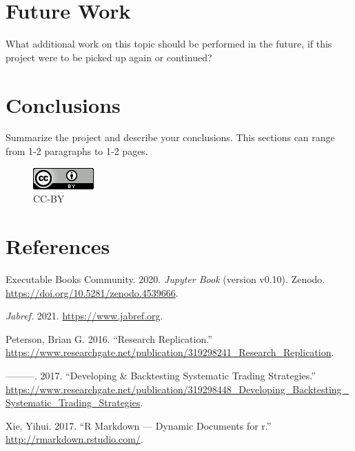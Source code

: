 \documentclass{article}
\newlength{\cslhangindent}
\newlength{\cslentryspacingunit} %
\newenvironment{CSLReferences}[2] %
 {%
  \setlength{\parindent}{0pt}
  \ifodd #1
  \let\oldpar\par
  \def\par{\hangindent=\cslhangindent\oldpar}
  \fi
  \setlength{\parskip}{#2\cslentryspacingunit}
 }%
 {}
\begin{document}
\hypertarget{future-work}{%
\section{Future Work}\label{future-work}}

What additional work on this topic should be performed in the future, if
this project were to be picked up again or continued?

\hypertarget{conclusions}{%
\section{Conclusions}\label{conclusions}}

Summarize the project and describe your conclusions. This sections can
range from 1-2 paragraphs to 1-2 pages.

\newpage

\begin{figure}
\centering
\includegraphics{cc_by_88x31.png}
\caption{CC-BY}
\end{figure}

\hypertarget{references}{%
\section*{References}\label{references}}

\hypertarget{refs}{}
\begin{CSLReferences}{1}{0}
\leavevmode{}%
Executable Books Community. 2020. \emph{Jupyter Book} (version v0.10).
Zenodo. \url{https://doi.org/10.5281/zenodo.4539666}.

\leavevmode{}%
\emph{Jabref.} 2021. \url{https://www.jabref.org}.

\leavevmode{}%
Peterson, Brian G. 2016. {``Research Replication.''}
\url{https://www.researchgate.net/publication/319298241_Research_Replication}.

\leavevmode{}%
---------. 2017. {``Developing \& Backtesting Systematic Trading
Strategies.''}
\url{https://www.researchgate.net/publication/319298448_Developing_Backtesting_Systematic_Trading_Strategies}.

\leavevmode{}%
Xie, Yihui. 2017. {``R Markdown --- Dynamic Documents for r.''}
\url{http://rmarkdown.rstudio.com/}.

\end{CSLReferences}



\end{document}

